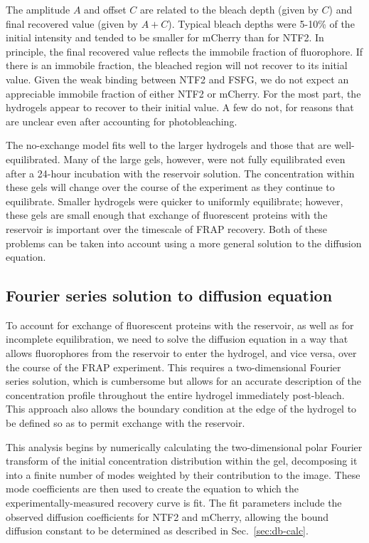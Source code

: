 The amplitude $A$ and offset $C$ are related to the bleach depth (given by $C$) and final recovered value (given by $A+C$).  Typical bleach depths were 5-10\% of the initial intensity and tended to be smaller for mCherry than for NTF2.  In principle, the final recovered value reflects the immobile fraction of fluorophore.  If there is an immobile fraction, the bleached region will not recover to its initial value.  Given the weak binding between NTF2 and FSFG, we do not expect an appreciable immobile fraction of either NTF2 or mCherry.  For the most part, the hydrogels appear to recover to their initial value.  A few do not, for reasons that are unclear even after accounting for photobleaching.

The no-exchange model fits well to the larger hydrogels and those that are well-equilibrated.  Many of the large gels, however, were not fully equilibrated even after a 24-hour incubation with the reservoir solution.  The concentration within these gels will change over the course of the experiment as they continue to equilibrate.  Smaller hydrogels were quicker to uniformly equilibrate; however, these gels are small enough that exchange of fluorescent proteins with the reservoir is important over the timescale of FRAP recovery.  Both of these problems can be taken into account using a more general solution to the diffusion equation.

\subsection{Fourier series solution to diffusion equation}

To account for exchange of fluorescent proteins with the reservoir, as well as for incomplete equilibration, we need to solve the diffusion equation in a way that allows fluorophores from the reservoir to enter the hydrogel, and vice versa, over the course of the FRAP experiment.  This requires a two-dimensional Fourier series solution, which is cumbersome but allows for an accurate description of the concentration profile throughout the entire hydrogel immediately post-bleach.  This approach also allows the boundary condition at the edge of the hydrogel to be defined so as to permit exchange with the reservoir.

This analysis begins by numerically calculating the two-dimensional polar Fourier transform of the initial concentration distribution within the gel, decomposing it into a finite number of modes weighted by their contribution to the image.  These mode coefficients are then used to create the equation to which the experimentally-measured recovery curve is fit.  The fit parameters include the observed diffusion coefficients for NTF2 and mCherry, allowing the bound diffusion constant to be determined as described in Sec.~\ref{sec:db-calc}.

